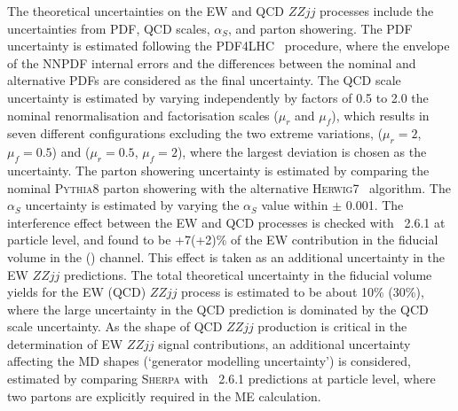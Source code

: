 The theoretical uncertainties on the EW and QCD $ZZjj$ processes include the uncertainties from PDF, QCD scales, $\alpha_{S}$, and parton showering. The PDF uncertainty is estimated following the PDF4LHC~\cite{Butterworth:2015oua} procedure, where the envelope of the NNPDF internal errors and the differences between the nominal and alternative PDFs are considered as the final uncertainty.
The QCD scale uncertainty is estimated by varying independently by factors of 0.5 to 2.0 the nominal renormalisation and factorisation scales ($\mu_r$ and $\mu_f$),
which results in seven different configurations excluding the two extreme variations, ($\mu_r = 2$, $\mu_f = 0.5$) and ($\mu_r = 0.5$, $\mu_f = 2$),
where the largest deviation is chosen as the uncertainty.
The parton showering uncertainty is estimated by comparing the nominal \textsc{Pythia8} parton showering with the alternative \textsc{Herwig7}~\cite{Bellm:2015jjp, Bahr:2008pv} algorithm. The $\alpha_{S}$ uncertainty is estimated by varying the $\alpha_{S}$ value within $\pm$ 0.001. The interference effect between the EW and QCD processes is checked with \MGMCatNLO~2.6.1 at particle level, and found to be +7(+2)\% of the EW contribution in the fiducial volume in the \lllljj (\llvvjj) channel. This effect is taken as an additional uncertainty in the EW $ZZjj$ predictions. The total theoretical uncertainty in the fiducial volume yields for the EW (QCD) $ZZjj$ process is estimated to be about 10\% (30\%), where the large uncertainty in the QCD prediction is dominated by the QCD scale uncertainty.
As the shape of QCD $ZZjj$ production is critical in the determination of EW $ZZjj$ signal contributions,
an additional uncertainty affecting the MD shapes (`generator modelling uncertainty') is considered,
estimated by comparing \textsc{Sherpa} with \MGMCatNLO~2.6.1 predictions at particle level, where two partons are explicitly required in the ME calculation.

